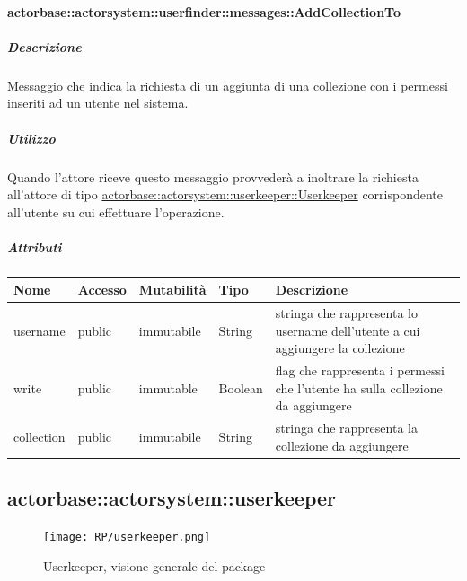 \documentclass{scalatekids-article}
\begin{document}
\paragraph{actorbase::actorsystem::userfinder::messages::AddCollectionTo}
\label{sec:actorbase::actorsystem::userfinder::messages::AddCollectionTo}

\subparagraph{Descrizione}
Messaggio che indica la richiesta di un aggiunta di una collezione con i permessi inseriti ad un utente nel sistema.

\subparagraph{Utilizzo}
Quando l'attore riceve questo messaggio provvederà a inoltrare la richiesta all'attore di tipo \hyperref[sec:actorbase::actorsystem::userkeeper::Userkeeper]{actorbase::\allowbreak{}actorsystem::\allowbreak{}userkeeper::\allowbreak{}Userkeeper}
corrispondente all'utente su cui effettuare l'operazione.

\subparagraph{Attributi}
\begin{tabular}{| p{3cm} | p{1.5cm} | p{2cm} | p{2cm} | p{8.5cm} |}
  \hline
  Nome & Accesso & Mutabilità & Tipo & Descrizione\\
  \hline
  username & public & immutabile & String & stringa che rappresenta lo username dell'utente a cui aggiungere la collezione \\
  \hline
  write & public & immutable & Boolean & flag che rappresenta i permessi che l'utente ha sulla collezione da aggiungere \\
  \hline
  collection & public & immutabile & String & stringa che rappresenta la collezione da aggiungere \\
  \hline
\end{tabular}


\subsection{actorbase::actorsystem::userkeeper} %
\label{sec:actorbase::actorsystem::userkeeper}

\begin{figure}[H]
  \begin{center}
    \texttt{[image: RP/userkeeper.png]}
    \caption{Userkeeper, visione generale del package}
  \end{center}
\end{figure}
\end{document}
